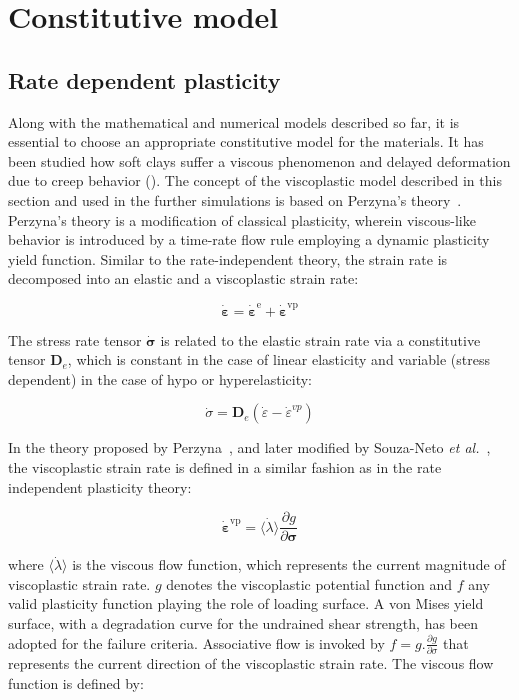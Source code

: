 \documentclass[applsci,journal,article,submit,moreauthors,pdftex]{Definitions/mdpi}
\begin{document}
 
\section{Constitutive model}


\subsection{Rate dependent plasticity}
Along with the mathematical and numerical models described so far, it is essential to choose an appropriate constitutive model for the materials. It has been studied how soft clays suffer a viscous phenomenon and delayed deformation due to creep behavior (\cite{Bjerrum1967}).
The concept of the viscoplastic model described in this section and used in the further simulations is based on Perzyna’s theory~\cite{Perzyna:66}. Perzyna’s theory is a modification of classical plasticity, wherein viscous-like behavior is introduced by a time-rate flow rule employing a dynamic plasticity yield function. Similar to the rate-independent theory, the strain rate is decomposed into an elastic and a viscoplastic strain rate:

\begin{equation}
\dot{\boldsymbol{\varepsilon}}=\dot{\boldsymbol{\varepsilon}}^{\mathrm{e}}+\dot{\boldsymbol{\varepsilon}}^{\mathrm{vp}}
\end{equation}

The stress rate tensor $\boldsymbol{\dot{\sigma}}$ is related to the elastic strain rate via a constitutive tensor $\boldsymbol{D}_{e}$, which is constant in the case of linear elasticity and variable (stress dependent) in the case of hypo or hyperelasticity:

\begin{equation}
\dot{\sigma}=\mathbf{D}_{e}\left(\dot{\varepsilon}-\dot{\varepsilon}^{v p}\right)
\end{equation}

In the theory proposed by Perzyna~\cite{Perzyna:66}, and later modified by Souza-Neto \textit{et al.}~\cite{DPOwen2005}, the viscoplastic strain rate is defined in a similar fashion as in the rate independent plasticity theory:

\begin{equation}
\dot{\boldsymbol{\varepsilon}}^{\mathrm{vp}}=\langle \dot{\lambda}\rangle \frac{\partial g}{\partial \boldsymbol{\sigma}}
\end{equation}

where  $\langle \dot{\lambda}\rangle$ is the viscous flow function, which represents the current magnitude of viscoplastic strain rate. $g$ denotes the viscoplastic potential function and $f$ any valid plasticity function playing the role of loading surface. A von Mises yield surface, with a degradation curve for the undrained shear strength, has been adopted for the failure criteria. Associative flow is invoked by $f=g . \frac{\partial g}{\partial \sigma}$ that represents the current direction of the viscoplastic strain rate. The viscous flow function is defined by:
\end{document}
